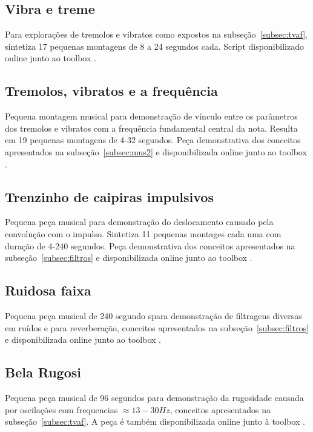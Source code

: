 \clearpage
\subsection{Vibra e treme}\label{ap:vibra}
Para explorações de tremolos e vibratos como expostos na subseção~\ref{subsec:tvaf}, sintetiza 17 pequenas montagens de 8 a 24 segundos cada. Script disponibilizado online junto ao toolbox \massa.\cite{MASSA}


\clearpage

\subsection{Tremolos, vibratos e a frequência}\label{ap:tremolos}
Pequena montagem musical para demonstração de vínculo entre os parâmetros dos tremolos e vibratos com a frequência fundamental central da nota. Resulta em 19 pequenas montagens de 4-32 segundos. Peça demonstrativa dos conceitos apresentados na subseção~\ref{subsec:mus2} e disponibilizada online junto ao toolbox \massa.\cite{MASSA}


\clearpage

\subsection{Trenzinho de caipiras impulsivos}\label{ap:trenzinho}
Pequena peça musical para demonstração do deslocamento causado pela convolução com o impulso. Sintetiza 11 pequenas montages cada uma com duração de 4-240 segundos. Peça demonstrativa dos conceitos apresentados na subseção~\ref{subsec:filtros} e disponibilizada online junto ao toolbox \massa.


\clearpage

\subsection{Ruidosa faixa}\label{ap:ruidosa}
Pequena peça musical de 240 segundo spara demonstração de filtragens diversas em ruídos e para reverberação, conceitos apresentados na subseção~\ref{subsec:filtros} e disponibilizada online junto ao toolbox \massa.\cite{MASSA}


\clearpage

\subsection{Bela Rugosi}\label{ap:bela}
Pequena peça musical de 96 segundos para demonstração da rugosidade causada por oscilações com frequencias $\approx 13-30 Hz$, conceitos apresentados na subseção~\ref{subsec:tvaf}. A peça é também disponibilizada online junto à toolbox \massa.\cite{MASSA}


